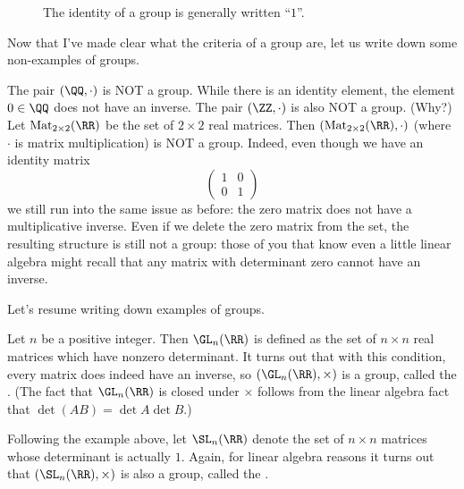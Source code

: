 \begin{figure}[ht]
	\centering
	\caption{The identity of a group is generally written ``$1$''.}
\end{figure}

Now that I've made clear what the criteria of a group are, let us write down some non-examples of groups.

\begin{example}
	\listhack
	\begin{itemize}
		\ii The pair $(\QQ, \cdot)$ is NOT a group.
		While there is an identity element, the element $0 \in \QQ$
		does not have an inverse.
		\ii The pair $(\ZZ, \cdot)$ is also NOT a group. (Why?)
		\ii Let $\Mat_{2 \times 2}(\RR)$ be the set of $2 \times 2$ real matrices.
		Then $(\Mat_{2 \times 2}(\RR), \cdot)$
		(where $\cdot$ is matrix multiplication) is NOT a group.
		Indeed, even though we have an identity matrix
		\[ \left(
			\begin{array}{cc}
				1 & 0 \\ 0 & 1
			\end{array}
			\right)
		\]
		we still run into the same issue as before:
		the zero matrix does not have a multiplicative inverse.
		\ii Even if we delete the zero matrix from the set,
		the resulting structure is still not a group:
		those of you that know even a little linear algebra
		might recall that any matrix with determinant zero
		cannot have an inverse.
	\end{itemize}
\end{example}

Let's resume writing down examples of groups.

\begin{example}
	Let $n$ be a positive integer.
	Then $\GL_n(\RR)$ is defined as the set of $n \times n$ real matrices which have nonzero determinant.
	It turns out that with this condition, every matrix does indeed have an inverse, so $(\GL_n(\RR), \times)$ is a group, called the
	.
	(The fact that $\GL_n(\RR)$ is closed under $\times$ follows from the linear algebra fact that $\det (AB) = \det A \det B$.)
\end{example}
\begin{example}
	Following the example above, let $\SL_n(\RR)$ denote 
	the set of $n \times n$ matrices whose determinant is actually $1$.
	Again, for linear algebra reasons
	it turns out that $(\SL_n(\RR), \times)$ is also a group, called the .
\end{example}

